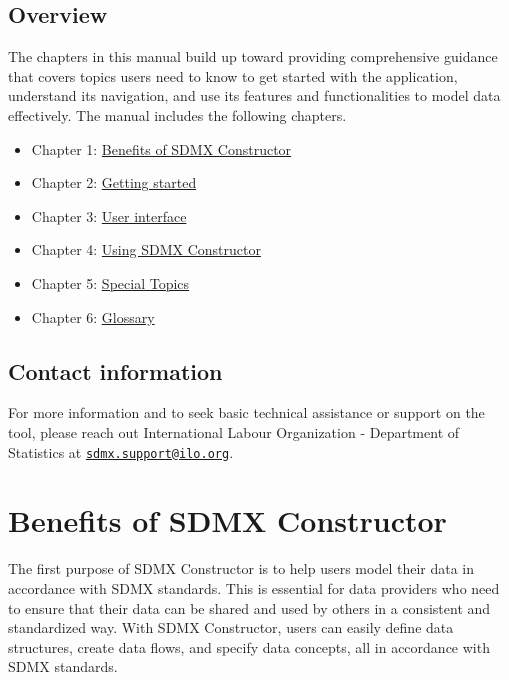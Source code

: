 \documentclass[
]{book}
\providecommand{\tightlist}{%
  \setlength{\itemsep}{0pt}\setlength{\parskip}{0pt}}
\theoremstyle{definition}
\theoremstyle{definition}
\theoremstyle{definition}
\theoremstyle{definition}
\theoremstyle{remark}
\begin{document}
\hypertarget{overview}{%
\section*{Overview}\label{overview}}

The chapters in this manual build up toward providing comprehensive guidance that covers topics users need to know to get started with the application, understand its navigation, and use its features and functionalities to model data effectively. The manual includes the following chapters.

\begin{itemize}
\tightlist
\item
  Chapter 1: \protect\hyperlink{benefits}{Benefits of SDMX Constructor}
\item
  Chapter 2: \protect\hyperlink{getting-started}{Getting started}
\item
  Chapter 3: \protect\hyperlink{user-interface}{User interface}
\item
  Chapter 4: \protect\hyperlink{using}{Using SDMX Constructor}
\item
  Chapter 5: \protect\hyperlink{special-topics}{Special Topics}
\item
  Chapter 6: \protect\hyperlink{glossary}{Glossary}
\end{itemize}

\hypertarget{contact-information}{%
\section*{Contact information}\label{contact-information}}

For more information and to seek basic technical assistance or support on the tool, please reach out International Labour Organization - Department of Statistics at \href{mailto:sdmx.support@ilo.org}{\nolinkurl{sdmx.support@ilo.org}}.

\hypertarget{benefits}{%
\chapter{Benefits of SDMX Constructor}\label{benefits}}

The first purpose of SDMX Constructor is to help users model their data in accordance with SDMX standards. This is essential for data providers who need to ensure that their data can be shared and used by others in a consistent and standardized way. With SDMX Constructor, users can easily define data structures, create data flows, and specify data concepts, all in accordance with SDMX standards.
\end{document}
